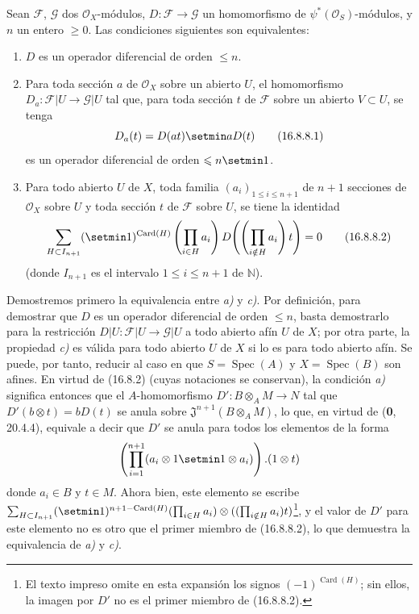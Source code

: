 \begin{proposition}[16.8.8]
\label{IV.16.8.8}
Sean $\mathscr{F}$, $\mathscr{G}$ dos $\mathcal{O}_X$-módulos,
$D:\mathscr{F}\to\mathscr{G}$ un homomorfismo de
$\psi^*(\mathcal{O}_S)$-módulos, y $n$ un entero $\geq0$. Las condiciones
siguientes son equivalentes:
\begin{enumerate}
  \item[\textup{a)}] $D$ es un operador diferencial de orden $\leq n$.
  \item[\textup{b)}] Para toda sección $a$ de $\mathcal{O}_X$ sobre un abierto
  $U$, el homomorfismo $D_a:\mathscr{F}|U\to\mathscr{G}|U$ tal que, para
  toda sección $t$ de $\mathscr{F}$ sobre un abierto $V\subset U$, se tenga
  \[
    D_a(t)=D(at)\setmin aD(t)
    \tag{16.8.8.1}
    \label{IV.16.8.8.1}
  \]
  es un operador diferencial de orden $\leq n\setmin 1$.
  \item[\textup{c)}] Para todo abierto $U$ de $X$, toda familia
  $(a_i)_{1\leq i\leq n+1}$ de $n+1$ secciones de $\mathcal{O}_X$ sobre
  $U$ y toda sección $t$ de $\mathscr{F}$ sobre $U$, se tiene la identidad
  \[
    \sum_{H\subset I_{n+1}}(\setmin 1)^{\operatorname{Card}(H)}
    \left(\prod_{i\in H}a_i\right)
    D\!\left(\left(\prod_{i\notin H}a_i\right)t\right)=0
    \tag{16.8.8.2}
    \label{IV.16.8.8.2}
  \]
  (donde $I_{n+1}$ es el intervalo $1\leq i\leq n+1$ de $\mathbb{N}$).
\end{enumerate}
\end{proposition}

Demostremos primero la equivalencia entre \emph{a)} y \emph{c)}. Por definición, para
demostrar que $D$ es un operador diferencial de orden $\leq n$, basta
demostrarlo para la restricción
$D|U:\mathscr{F}|U\to\mathscr{G}|U$ a todo abierto afín $U$ de $X$; por
otra parte, la propiedad \emph{c)} es válida para todo abierto $U$ de $X$ si lo es
para todo abierto afín. Se puede, por tanto, reducir al caso en que
$S=\operatorname{Spec}(A)$ y $X=\operatorname{Spec}(B)$ son afines. En
virtud de (16.8.2) (cuyas notaciones se conservan), la condición \emph{a)} significa
entonces que el $A$-homomorfismo $D':B\otimes_A M\to N$ tal que
$D'(b\otimes t)=bD(t)$ se anula sobre
$\mathfrak{J}^{n+1}(B\otimes_A M)$, lo que, en virtud de (\textbf 0, 20.4.4),
equivale a decir que $D'$ se anula para todos los elementos de la forma
\[
  \left(\prod_{i=1}^{n+1}(a_i\otimes1\setmin 1\otimes a_i)\right).(1\otimes t)
\]
donde $a_i\in B$ y $t\in M$. Ahora bien, este elemento se escribe
$\sum_{H\subset I_{n+1}}(\setmin 1)^{n+1-\operatorname{Card}(H)}(\prod_{i\in H}a_i)\otimes((\prod_{i\notin H}a_i)t)$\footnote{El texto impreso omite en esta
expansión los signos $(-1)^{\operatorname{Card}(H)}$; sin ellos, la imagen
por $D'$ no es el primer miembro de (16.8.8.2).},
y el valor de $D'$ para este elemento no es otro que el primer miembro de
(16.8.8.2), lo que demuestra la equivalencia de \emph{a)} y \emph{c)}.

